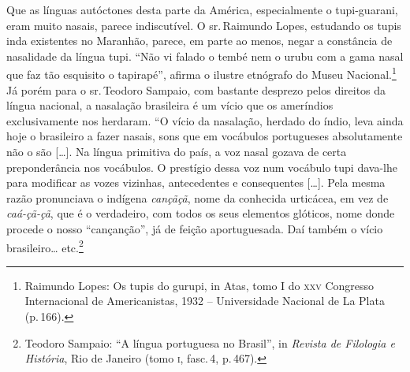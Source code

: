Que as línguas autóctones desta parte da América, especialmente o
tupi-guarani, eram muito nasais, parece indiscutível. O sr.\,Raimundo
Lopes, estudando os tupis inda existentes no Maranhão, parece, em parte
ao menos, negar a constância de nasalidade da língua tupi. ``Não vi
falado o tembé nem o urubu com a gama nasal que faz tão esquisito o
tapirapé'', afirma o ilustre etnógrafo do Museu Nacional.\footnote{Raimundo Lopes: Os tupis do gurupi, in Atas, tomo I do \textsc{xxv} Congresso
Internacional de Americanistas, 1932 -- Universidade Nacional de La
Plata (p.\,166).} Já porém
para o sr.\,Teodoro Sampaio, com bastante desprezo pelos direitos da
língua nacional, a nasalação brasileira é um vício que os ameríndios
exclusivamente nos herdaram. ``O vício da nasalação, herdado do índio,
leva ainda hoje o brasileiro a fazer nasais, sons que em vocábulos
portugueses absolutamente não o são {[}\ldots{}{]}. Na língua primitiva do
país, a voz nasal gozava de certa preponderância nos vocábulos. O
prestígio dessa voz num vocábulo tupi dava-lhe para modificar as vozes
vizinhas, antecedentes e consequentes {[}\ldots{}{]}. Pela mesma razão
pronunciava o indígena \textit{cançãçã}, nome da conhecida urticácea, em vez
de \textit{caá-çã-çã}, que é o verdadeiro, com todos os seus elementos
glóticos, nome donde procede o nosso ``cançanção'', já de feição
aportuguesada. Daí também o vício brasileiro\ldots{} etc.\footnote{Teodoro Sampaio: ``A língua portuguesa no Brasil'', in \emph{Revista de
Filologia e História}, Rio de Janeiro (tomo \textsc{i}, fasc.\,4, p.\,467).}

